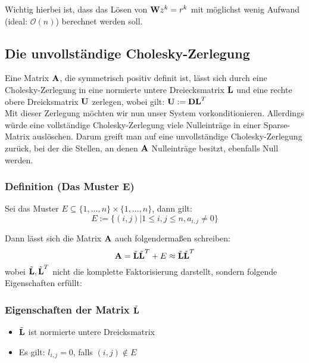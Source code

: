 Wichtig hierbei ist, dass das Lösen von ${\textbf{W}}z^{k} = r^{k}$ mit möglichst wenig Aufwand (ideal: $\mathcal{O}(n)$) berechnet werden soll.

\subsection{Die unvollständige Cholesky-Zerlegung}\label{ss.ICCG}

Eine Matrix ${\textbf{A}}$, die symmetrisch positiv definit ist, lässt sich durch eine Cholesky-Zerlegung in eine normierte untere Dreiecksmatrix ${\textbf{L}}$ und eine rechte obere Dreicksmatrix ${\textbf{U}}$ zerlegen, wobei gilt: ${\textbf{U}} := {\textbf{D}}{\textbf{L}}^{T}$ \\
Mit dieser Zerlegung möchten wir nun unser System vorkonditionieren. Allerdings würde eine vollständige Cholesky-Zerlegung viele Nulleinträge in einer Sparse-Matrix auslöschen. Darum greift man auf eine unvollständige Cholesky-Zerlegung zurück, bei der die Stellen, an denen ${\textbf{A}}$ Nulleinträge besitzt, ebenfalls Null werden.

\subsubsection{Definition (Das Muster E)}\label{sss.Muster E}

Sei das Muster $E \subseteq \{1,...,n\} \times \{1,...,n\}$, dann gilt:
\begin{equation}
E := \{(i,j) | 1 \le i,j \le n, a_{i,j} \ne 0 \}
\end{equation}

Dann lässt sich die Matrix ${\textbf{A}}$ auch folgendermaßen schreiben:
\begin{equation}
{\textbf{A}} = \tilde{{\textbf{L}}} \tilde{{\textbf{L}}}^{T} + E \approx \tilde{{\textbf{L}}} \tilde{{\textbf{L}}}^{T}
\end{equation}
wobei $\tilde{{\textbf{L}}}, \tilde{{\textbf{L}}}^{T}$ nicht die komplette Faktorisierung darstellt, sondern folgende Eigenschaften erfüllt:

\subsubsection{Eigenschaften der Matrix $\tilde{{\textbf{L}}}$}\label{sss.Eigenschaften L CZ}
\begin{itemize}
\item $\tilde{{\textbf{L}}}$ ist normierte untere Dreicksmatrix
\item Es gilt: $l_{i,j} = 0$, falls $(i,j) \notin E$
\end{itemize}

